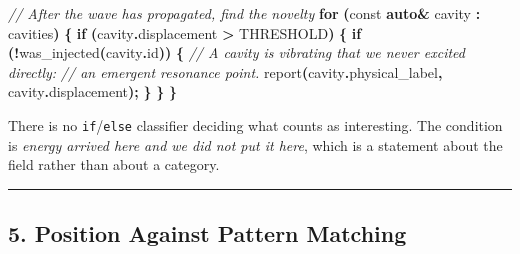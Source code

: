 \documentclass[
  11pt,
  a4paper,
]{article}
\newenvironment{Shaded}{\begin{snugshade}}{\end{snugshade}}
\newcommand{\AttributeTok}[1]{\textcolor[rgb]{0.13,0.29,0.53}{#1}}
\newcommand{\CommentTok}[1]{\textcolor[rgb]{0.56,0.35,0.01}{\textit{#1}}}
\newcommand{\ControlFlowTok}[1]{\textcolor[rgb]{0.13,0.29,0.53}{\textbf{#1}}}
\newcommand{\KeywordTok}[1]{\textcolor[rgb]{0.13,0.29,0.53}{\textbf{#1}}}
\newcommand{\NormalTok}[1]{#1}
\newcommand{\OperatorTok}[1]{\textcolor[rgb]{0.81,0.36,0.00}{\textbf{#1}}}
\begin{document}
\begin{Shaded}
\begin{Highlighting}[]
\CommentTok{// After the wave has propagated, find the novelty}
\ControlFlowTok{for} \OperatorTok{(}\AttributeTok{const} \KeywordTok{auto}\OperatorTok{\&}\NormalTok{ cavity }\OperatorTok{:}\NormalTok{ cavities}\OperatorTok{)} \OperatorTok{\{}
    \ControlFlowTok{if} \OperatorTok{(}\NormalTok{cavity}\OperatorTok{.}\NormalTok{displacement }\OperatorTok{\textgreater{}}\NormalTok{ THRESHOLD}\OperatorTok{)} \OperatorTok{\{}
        \ControlFlowTok{if} \OperatorTok{(!}\NormalTok{was\_injected}\OperatorTok{(}\NormalTok{cavity}\OperatorTok{.}\NormalTok{id}\OperatorTok{))} \OperatorTok{\{}
            \CommentTok{// A cavity is vibrating that we never excited directly:}
            \CommentTok{// an emergent resonance point.}
\NormalTok{            report}\OperatorTok{(}\NormalTok{cavity}\OperatorTok{.}\NormalTok{physical\_label}\OperatorTok{,}\NormalTok{ cavity}\OperatorTok{.}\NormalTok{displacement}\OperatorTok{);}
        \OperatorTok{\}}
    \OperatorTok{\}}
\OperatorTok{\}}
\end{Highlighting}
\end{Shaded}

There is no \texttt{if}/\texttt{else} classifier deciding what counts as
interesting. The condition is \emph{energy arrived here and we did not
put it here}, which is a statement about the field rather than about a
category.

\begin{center}\rule{0.5\linewidth}{0.5pt}\end{center}

\subsection{5. Position Against Pattern
Matching}\label{position-against-pattern-matching}
\end{document}
